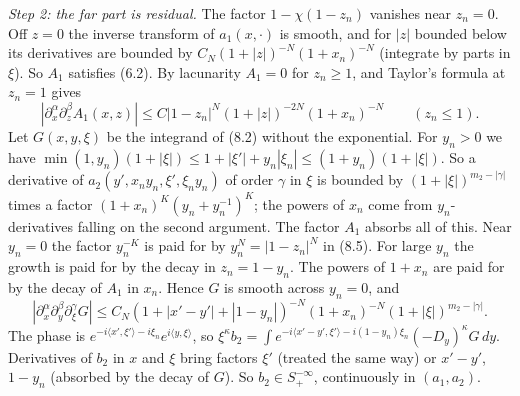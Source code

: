 \documentclass[
  11pt,
]{article}
\begin{document}
\emph{Step 2: the far part is residual.} The factor \(1-\chi(1-z_n)\)
vanishes near \(z_n=0\). Off \(z=0\) the inverse transform of
\(a_1(x,\cdot)\) is smooth, and for \(|z|\) bounded below its
derivatives are bounded by \(C_N(1+|z|)^{-N}(1+x_n)^{-N}\) (integrate by
parts in \(\xi\)). So \(A_1\) satisfies (6.2). By lacunarity \(A_1=0\)
for \(z_n\geq1\), and Taylor's formula at \(z_n=1\) gives \[
|\partial_x^\alpha\partial_z^\beta A_1(x,z)|\leq C|1-z_n|^N(1+|z|)^{-2N}(1+x_n)^{-N}\qquad(z_n\leq1).
\tag{8.5}
\] Let \(G(x,y,\xi)\) be the integrand of (8.2) without the exponential.
For \(y_n>0\) we have
\(\min(1,y_n)(1+|\xi|)\leq1+|\xi'|+y_n|\xi_n|\leq(1+y_n)(1+|\xi|)\). So
a derivative of \(a_2(y',x_ny_n,\xi',\xi_ny_n)\) of order \(\gamma\) in
\(\xi\) is bounded by \((1+|\xi|)^{m_2-|\gamma|}\) times a factor
\((1+x_n)^K(y_n+y_n^{-1})^K\); the powers of \(x_n\) come from
\(y_n\)-derivatives falling on the second argument. The factor \(A_1\)
absorbs all of this. Near \(y_n=0\) the factor \(y_n^{-K}\) is paid for
by \(y_n^N=|1-z_n|^N\) in (8.5). For large \(y_n\) the growth is paid
for by the decay in \(z_n=1-y_n\). The powers of \(1+x_n\) are paid for
by the decay of \(A_1\) in \(x_n\). Hence \(G\) is smooth across
\(y_n=0\), and \[
|\partial_x^\alpha\partial_y^\beta\partial_\xi^\gamma G|\leq C_N(1+|x'-y'|+|1-y_n|)^{-N}(1+x_n)^{-N}(1+|\xi|)^{m_2-|\gamma|}.
\] The phase is
\(e^{-i\langle x',\xi'\rangle-i\xi_n}e^{i\langle y,\xi\rangle}\), so
\(\xi^\kappa b_2=\int e^{-i\langle x'-y',\xi'\rangle-i(1-y_n)\xi_n}(-D_y)^\kappa G\,dy\).
Derivatives of \(b_2\) in \(x\) and \(\xi\) bring factors \(\xi'\)
(treated the same way) or \(x'-y'\), \(1-y_n\) (absorbed by the decay of
\(G\)). So \(b_2\in S^{-\infty}_+\), continuously in \((a_1,a_2)\).
\end{document}
